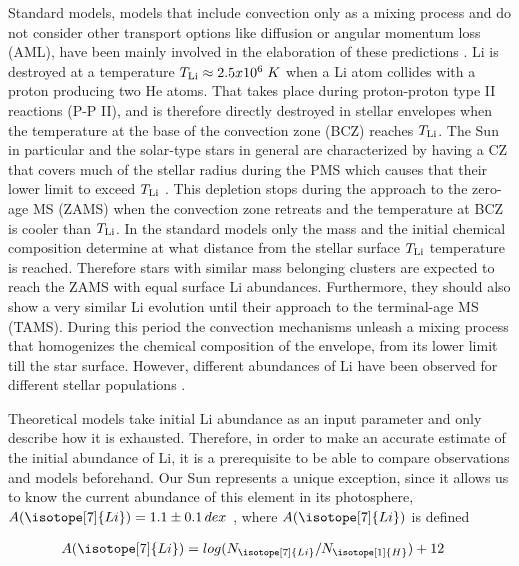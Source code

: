 \documentclass[fleqn,usenatbib]{mnras}
\begin{document}
Standard models, models that include convection only as a mixing process and do not consider other transport options like diffusion or angular momentum loss (AML), have been mainly involved in the elaboration of these predictions \citep{Sestito2005}. Li is destroyed at a temperature $T_{\mathrm{Li}} \approx 2.5 x 10^6\; K$ when a Li atom collides with a proton producing two He atoms. That takes place during proton-proton type II reactions (P-P II), and is therefore directly destroyed in stellar envelopes when the temperature at the base of the convection zone (BCZ) reaches  $T_{\mathrm{Li}}$. The Sun in particular and the solar-type stars in general are characterized by having a CZ that covers much of the stellar radius during the PMS which causes that their lower limit to exceed $T_{\mathrm{Li}}$ \citep{Iben1965}. This depletion stops during the approach to the zero-age MS (ZAMS) when the convection zone retreats and the temperature at BCZ is cooler than $T_{\mathrm{Li}}$. In the standard models only the mass and the initial chemical composition determine at what distance from the stellar surface $T_{\mathrm{Li}}$ temperature is reached. Therefore stars with similar mass belonging clusters are expected to reach the ZAMS with equal surface Li abundances. Furthermore, they should also show a very similar Li evolution until their approach to the terminal-age MS (TAMS). During this period the convection mechanisms unleash a mixing process that homogenizes the chemical composition of the envelope, from its lower limit till the star surface. However, different abundances of Li have been observed for different stellar populations \citep[see][and references therein]{Somers2014}.\par

Theoretical models take initial Li abundance as an input parameter and only describe how it is exhausted. Therefore, in order to make an accurate estimate of the initial abundance of Li, it is a prerequisite to be able to compare observations and models beforehand. Our Sun represents a unique exception, since it allows us to know the current abundance of this element in its photosphere, $A(\isotope[7]{Li}) = 1.1 \pm 0.1 \, dex$ \citep{Jeffries2004}, where $A(\isotope[7]{Li})$ is defined


\begin{ceqn}
\begin{align}
    A(\isotope[7]{Li}) &= log(N_{\isotope[7]{Li}} / N_{\isotope[1]{H}}) + 12
    \label{eq:A_Li}
\end{align}
\end{ceqn}
\end{document}
